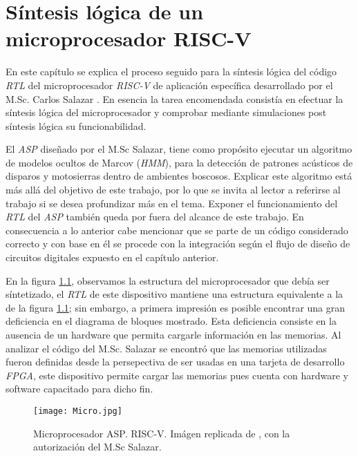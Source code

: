 \chapter{Síntesis lógica de un microprocesador RISC-V}
\label{ch:asp_syn}

En este capítulo se explica el proceso seguido para la síntesis lógica del código \textit{RTL} del microprocesador \textit{RISC-V} de aplicación específica desarrollado por el M.Sc. Carlos Salazar \cite{Carlosthesis}. En esencia la tarea encomendada consistía en efectuar la síntesis lógica del microprocesador y comprobar mediante simulaciones post síntesis lógica su funcionabilidad.

El \textit{ASP} diseñado por el M.Sc Salazar, tiene como propósito ejecutar un algoritmo de modelos ocultos de Marcov (\textit{HMM}), para la detección de patrones acústicos de disparos y motosierras dentro de ambientes boscosos. Explicar este algoritmo está más allá del objetivo de este trabajo, por lo que se invita al lector a referirse al trabajo \cite{Carlosthesis} si se desea profundizar más en el tema. Exponer el funcionamiento del \textit{RTL} del \textit{ASP} también queda por fuera del alcance de este trabajo. En consecuencia a lo anterior cabe mencionar que se parte de un código considerado correcto y con base en él se procede con la integración según el flujo de diseño de circuitos digitales expuesto en el capítulo anterior. 


En la figura \ref{fig:micro}, observamos la estructura del microprocesador que debía ser síntetizado, el \textit{RTL} de este dispositivo mantiene una estructura equivalente a la de la figura \ref{fig:micro}; sin embargo, a primera impresión es posible encontrar una gran deficiencia en el diagrama de bloques mostrado. Esta deficiencia consiste en la ausencia de un hardware que permita cargarle información en las memorias. Al analizar el código del M.Sc. Salazar se encontró que las memorias utilizadas fueron definidas desde la persepectiva de ser usadas en una tarjeta de desarrollo \textit{FPGA}, este dispositivo permite cargar las memorias pues cuenta con hardware y software capacitado para dicho fin.

\begin{figure}[t]
\texttt{[image: Micro.jpg]}
\centering
\caption{Microprocesador ASP. RISC-V. Imágen replicada de \cite{Carlosthesis}, con la autorización del M.Sc Salazar.}
\label{fig:micro}
\end{figure}

